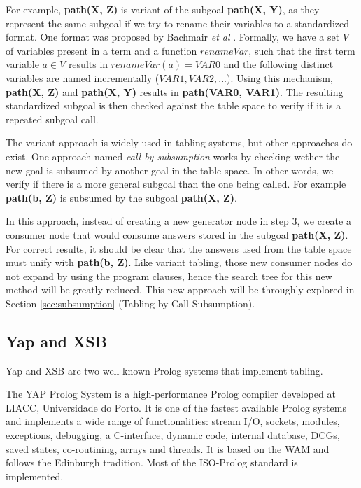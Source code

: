 For example, \textbf{path(X, Z)} is variant of the subgoal \textbf{path(X, Y)}, as they represent the same subgoal if we try
to rename their variables to a standardized format. One format was proposed by Bachmair \textit{et al} \cite{Bachmair-93}. Formally,
we have a set $V$ of variables present in a term and a function $renameVar$, such that the first term variable $a \in V$
results in $renameVar(a) = VAR0$ and the following distinct variables are named incrementally ($VAR1, VAR2, ...$).
Using this mechanism, \textbf{path(X, Z)} and \textbf{path(X, Y)} results in \textbf{path(VAR0, VAR1)}. The resulting
standardized subgoal is then checked against the table space to verify if it is a repeated subgoal call.

The variant approach is widely used in tabling systems, but other approaches do exist. One approach named
\textit{call by subsumption} works by checking wether the new goal is subsumed by another goal in the table space.
In other words, we verify if there is a more general subgoal than the one being called. For example
\textbf{path(b, Z)} is subsumed by the subgoal \textbf{path(X, Z)}.

In this approach, instead of creating
a new generator node in step 3, we create a consumer node that would consume answers stored in the subgoal \textbf{path(X, Z)}.
For correct results, it should be clear that the answers used from the table space must unify with \textbf{path(b, Z)}.
Like variant tabling, those new consumer nodes do not expand by using the program clauses, hence the search tree for this new
method will be greatly reduced. This new approach will be throughly explored in Section \ref{sec:subsumption} (Tabling by Call Subsumption).

  \subsection{Yap and XSB}
  
  Yap \cite{system-yap} and XSB \cite{system-xsb} are two well known Prolog systems that implement tabling.
  
  The YAP Prolog System is a high-performance Prolog compiler developed at LIACC, Universidade do Porto.
  It is one of the fastest available Prolog systems and implements a wide range of functionalities: 
  stream I/O, sockets, modules, exceptions, debugging, a C-interface, dynamic code, internal database, DCGs, saved states, co-routining, arrays and threads.
  It is based on the WAM and follows the Edinburgh tradition. Most of the ISO-Prolog standard is implemented.
  
